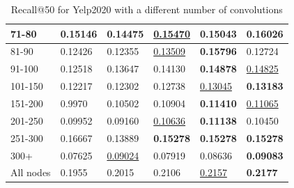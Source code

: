 \begin{table}[]
\begin{tabular}{|l|l|l|l|l|l|}
        71-80     & 0.15146                    & 0.14475                    & \underline{0.15470}        & 0.15043                    & \textbf{0.16026}           \\ \hline
        81-90     & 0.12426                    & 0.12355                    & \underline{0.13509}        & \textbf{0.15796}           & 0.12724                    \\ \hline
        91-100    & 0.12518                    & 0.13647                    & 0.14130                    & \textbf{0.14878}           & \underline{0.14825}        \\ \hline
        101-150   & 0.12217                    & 0.12302                    & 0.12738                    & \underline{0.13045}        & \textbf{0.13183}           \\ \hline
        151-200   & 0.9970                     & 0.10502                    & 0.10904                    & \textbf{0.11410}           & \underline{0.11065}        \\ \hline
        201-250   & 0.09952                    & 0.09160                    & \underline{0.10636}        & \textbf{0.11138}           & 0.10450                    \\ \hline
        251-300   & 0.16667                    & 0.13889                    & \textbf{0.15278}           & \textbf{0.15278}           & \textbf{0.15278}           \\ \hline
        300+      & 0.07625                    & \underline{0.09024}        & 0.07919                    & 0.08636                    & \textbf{0.09083}           \\ \hline
        All nodes   & 0.1955                     & 0.2015                     & 0.2106                     & \underline{0.2157}         & \textbf{0.2177}            \\ \hline
    \end{tabular}
    \caption{Recall@50 for Yelp2020 with a different number of convolutions}
    \label{tab:Yelp2020-recall-evaluation-mean}
\end{table}

